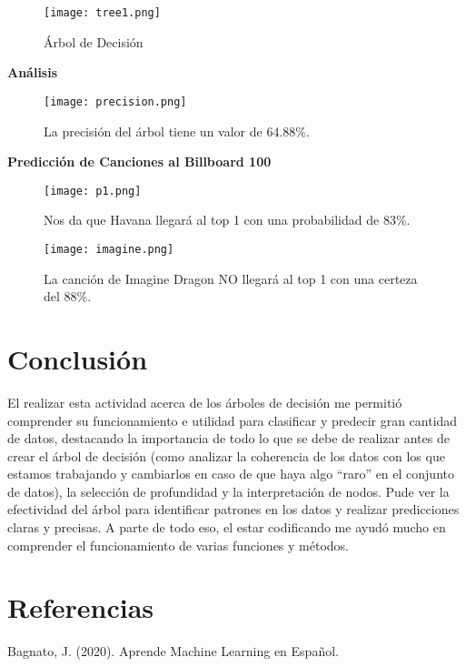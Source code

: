 \documentclass{article}
\begin{document}
\begin{figure}[H]
    \centering
\texttt{[image: tree1.png]}
    \caption{{\small Árbol de Decisión }}
    \label{fig:enter-label}
\end{figure}



\textbf{Análisis}


\begin{figure}[H]
    \centering
\texttt{[image: precision.png]}
    \caption{{\small La precisión del árbol tiene un valor de 64.88\%. }}
    \label{fig:enter-label}
\end{figure}



\textbf{Predicción de Canciones al Billboard 100}


\begin{figure}[H]
    \centering
\texttt{[image: p1.png]}
    \caption{{\small Nos da que Havana llegará al top 1 con una probabilidad de 83\%. }}
    \label{fig:enter-label}
\end{figure}

\begin{figure}[H]
    \centering
\texttt{[image: imagine.png]}
    \caption{{\small La canción de Imagine Dragon NO llegará al top 1 con una certeza del 88\%. }}
    \label{fig:enter-label}
\end{figure}




\section{Conclusión}

El realizar esta actividad acerca de los árboles de decisión me permitió comprender su funcionamiento e utilidad para clasificar y predecir gran cantidad de datos, destacando la importancia de todo lo que se debe de realizar antes de crear el árbol de decisión (como analizar la coherencia de los datos con los que estamos trabajando y cambiarlos en caso de que haya algo ``raro'' en el conjunto de datos), la selección de profundidad y la interpretación de nodos. Pude ver la efectividad del árbol para identificar patrones en los datos y realizar predicciones claras y precisas. A parte de todo eso, el estar codificando me ayudó mucho en comprender el funcionamiento de varias funciones y métodos.



\section{Referencias}
Bagnato, J. (2020). Aprende Machine Learning en Español.
\end{document}
